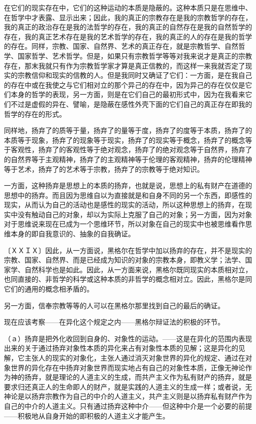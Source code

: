 \documentclass[a4paper,twoside,12pt,AutoFakeBold]{ctexart}
\begin{document}
在它们的现实存在中，它们的这种运动的本质是隐蔽的。这种本质只是在思维中、在哲学中才表露、显示出来；因此，我的真正的宗教存在是我的宗教哲学的存在，我的真正的政治存在是我的法哲学的存在，我的真正的自然存在是我的自然哲学的存在，我的真正艺术存在是我的艺术哲学的存在，我的真正的人的存在是我的哲学的存在。同样，宗教、国家、自然界、艺术的真正存在，就是宗教哲学、自然哲学、国家哲学、艺术哲学。但是，如果只有宗教哲学等等对我来说才是真正的宗教存在，那末我就只有作为宗教哲学家才算是真正信教的，而这样一来我就否定了现实的宗教信仰和现实的信教的人。但是我同时又确证了它们：一方面，是在我自己的存在中或在我使之与它们相对立的那个异己的存在中，因为异己的存在仅仅是它们本身的哲学的表现，另一方面，则是在它们自己的最初形式中，因为在我看来它们不过是虚假的异在、譬喻，是隐蔽在感性外壳下面的它们自己的真正存在即我的哲学的存在的形式。

同样地，扬弃了的质等于量，扬弃了的量等于度，扬弃了的度等于本质，扬弃了的本质等于现象，扬弃了的现象等于现实，扬弃了的现实等于概念，扬弃了的概念等于客观性，扬弃了的客观性等于绝对观念，扬弃了的绝对观念等于自然界，扬弃了的自然界等于主观精神，扬弃了的主观精神等于伦理的客观精神，扬弃的伦理精神等于艺术，扬弃了的艺术等于宗教，扬弃了的宗教等于绝对知识。

一方面，这种扬弃是思想上的本质的扬弃，也就是说，思想上的私有财产在道德的思想中的扬弃。而且因为思维自以为直接就是和自身不同的另一个东西，即感性的现实，从而认为自己的活动也是感性的现实的活动，所以这种思想上的扬弃，在现实中没有触动自己的对象，却以为实际上克服了自己的对象；另一方面，因为对象对于思维说来现在已成为一个思维环节，所以对象在自己的现实中也被思维看作思维本身的即自我意识的、抽象的自我确证。

〔ＸＸＩＸ〕因此，从一方面说，黑格尔在哲学中加以扬弃的存在，并不是现实的宗教、国家、自然界、而是已经成为知识的对象的宗教本身，即教义学；法学、国家学、自然科学也是如此。因此，从一方面来说，黑格尔既同现实的本质相对立，也同直接的、非哲学的科学或这种本质的非哲学的概念相对立。因此，黑格尔是同它们的通用的概念相矛盾的。

另一方面，信奉宗教等等的人可以在黑格尔那里找到自己的最后的确证。

现在应该考察——在异化这个规定之内——黑格尔辩证法的积极的环节。

（ａ）扬弃是把外化收回到自身的、对象性的运动。——这是在异化的范围内表现出来的关于通过扬弃对象性本质的异化来占有对象性本质的见解；这是异化的见解，它主张人的现实的对象化，主张人通过消灭对象世界的异化的规定、通过在对象世界的异化存在中扬弃对象世界而现实地占有自己的对象性本质，正像无神论作为神的扬弃，就是理论的人道主义的生成，而共产主义作为私有财产的扬弃，就是要求归还真正人的生命即人的财产，就是实践的人道主义的生成一样；或者说，无神论是以扬弃宗教作为自己的中介的人道主义，共产主义则是以扬弃私有财产作为自己的中介的人道主义。只有通过扬弃这种中介——但这种中介是一个必要的前提——积极地从自身开始的即积极的人道主义才能产生。
\end{document}
